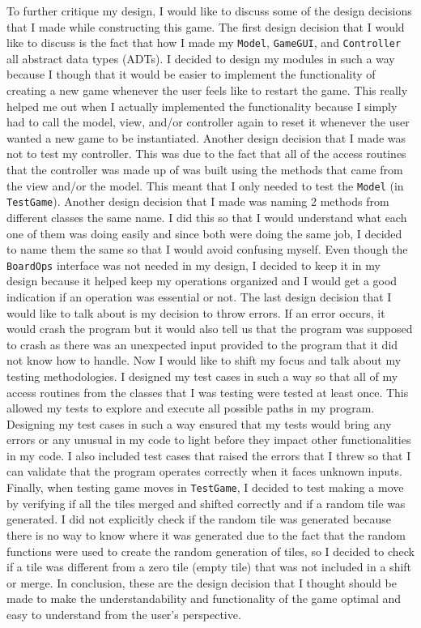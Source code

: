 \documentclass[12pt]{article}
\begin{document}
\hspace{\parindent}To further critique my design, I would like to discuss some of the design decisions that I made while constructing this game. The first design decision that I would like to discuss is the fact that how I made my \verb|Model|, \verb|GameGUI|, and \verb|Controller| all abstract data types (ADTs). I decided to design my modules in such a way because I though that it would be easier to implement the functionality of creating a new game whenever the user feels like to restart the game. This really helped me out when I actually implemented the functionality because I simply had to call the model, view, and/or controller again to reset it whenever the user wanted a new game to be instantiated. Another design decision that I made was not to test my controller. This was due to the fact that all of the access routines that the controller was made up of was built using the methods that came from the view and/or the model. This meant that I only needed to test the \verb|Model| (in \verb|TestGame|). Another design decision that I made was naming 2 methods from different classes the same name. I did this so that I would understand what each one of them was doing easily and since both were doing the same job, I decided to name them the same so that I would avoid confusing myself. Even though the \verb|BoardOps| interface was not needed in my design, I decided to keep it in my design because it helped keep my operations organized and I would get a good indication if an operation was essential or not. The last design decision that I would like to talk about is my  decision to throw errors. If an error occurs, it would crash the program but it would also tell us that the program was supposed to crash as there was an unexpected input provided to the program that it did not know how to handle. Now I would like to shift my focus and talk about my testing methodologies. I designed my test cases in such a way so that all of my access routines from the classes that I was testing were tested at least once. This allowed my tests to explore and execute all possible paths in my program. Designing my test cases in such a way ensured that my tests would bring any errors or any unusual in my code to light before they impact other functionalities in my code. I also included test cases that raised the errors that I threw so that I can validate that the program operates correctly when it faces unknown inputs. Finally, when testing game moves in \verb|TestGame|, I decided to test making a move by verifying if all the tiles merged and shifted correctly and if a random tile was generated. I did not explicitly check if the random tile was generated because there is no way to know where it was generated due to the fact that the random functions were used to create the random generation of tiles, so I decided to check if a tile was different from a zero tile (empty tile) that was not included in a shift or merge. In conclusion, these are the design decision that I thought should be made to make the understandability and functionality of the game optimal and easy to understand from the user's perspective.
\end{document}
